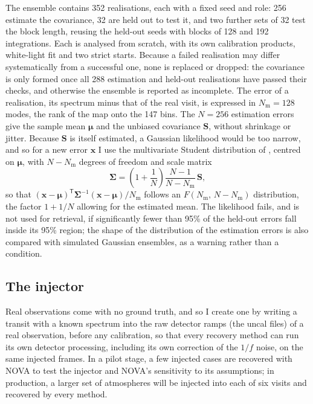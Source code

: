 The ensemble contains 352 realisations, each with a fixed seed and role: 256
estimate the covariance, 32 are held out to test it, and two further sets of
32 test the block length, reusing the held-out seeds with blocks of 128 and
192 integrations. Each is
analysed from scratch, with its own calibration products, white-light fit
and two strict starts. Because a failed realisation may differ systematically
from a successful one, none is replaced or dropped: the covariance is only
formed once all 288 estimation and held-out realisations have passed their
checks, and otherwise the ensemble is reported as incomplete. The error of a realisation, its spectrum minus that of the real visit, is
expressed in $N_{\mathrm{m}}=128$ modes, the rank of the map onto the 147
bins. The $N=256$ estimation errors give the
sample mean $\bm{\mu}$ and the unbiased covariance $\bm{S}$, without shrinkage
or jitter. Because $\bm{S}$ is itself estimated, a Gaussian likelihood would be
too narrow, and so for a new error $\bm{x}$ I use the multivariate Student
distribution of \citet{SellentinHeavens2016}, centred on $\bm{\mu}$, with
$N-N_{\mathrm{m}}$ degrees of freedom and scale matrix
\begin{equation}
 \bm{\Sigma}=\left(1+\frac{1}{N}\right)\frac{N-1}{N-N_{\mathrm{m}}}\,\bm{S},
 \label{eq:finite-ensemble}
\end{equation}
so that $(\bm{x}-\bm{\mu})^{\mathsf T}\bm{\Sigma}^{-1}(\bm{x}-\bm{\mu})/
N_{\mathrm{m}}$ follows an $F(N_{\mathrm{m}},\,N-N_{\mathrm{m}})$
distribution, the factor $1+1/N$ allowing for the estimated mean. The
likelihood fails, and is not used for retrieval, if significantly fewer than
95\% of the held-out errors fall inside its 95\% region;
the shape of the distribution of the estimation errors is also compared with
simulated Gaussian ensembles, as a warning rather than a condition.

\subsection{The injector}
\label{sec:injector}

Real observations come with no ground truth, and so I create one by writing
a transit with a known spectrum into the raw detector ramps (the uncal files)
of a real observation, before any calibration, so that every recovery method
can run its own detector processing, including its own correction of the
$1/f$ noise, on the same injected frames. In a pilot stage, a few injected
cases are recovered with NOVA to test the injector and NOVA's sensitivity to
its assumptions; in production, a larger set of atmospheres will be injected
into each of six visits and recovered by every method.
\label{sec:baseline}

